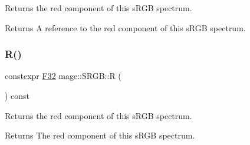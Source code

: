 Returns the red component of this s\+R\+GB spectrum.

\begin{DoxyReturn}{Returns}
A reference to the red component of this s\+R\+GB spectrum. 
\end{DoxyReturn}
\mbox{\label{structmage_1_1_s_r_g_b_a3832f4baad888be7c26eb18ab22e4aae}} 
\subsubsection{\texorpdfstring{R()}{R()}\hspace{0.1cm}{\footnotesize\ttfamily [2/2]}}
{\footnotesize\ttfamily constexpr \mbox{\hyperlink{namespacemage_aa97e833b45f06d60a0a9c4fc22ae02c0}{F32}} mage\+::\+S\+R\+G\+B\+::R (\begin{DoxyParamCaption}{ }\end{DoxyParamCaption}) const\hspace{0.3cm}{\ttfamily [noexcept]}}

Returns the red component of this s\+R\+GB spectrum.

\begin{DoxyReturn}{Returns}
The red component of this s\+R\+GB spectrum. 
\end{DoxyReturn}
